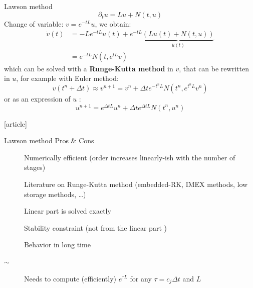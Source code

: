 \documentclass{beamer}
\newcommand{\cmark}{{\color{dgreen}\ding{52}}}
\newcommand{\xmark}{{\color{mred}\ding{55}}}
\newcommand{\bmark}{{\color{morange}$\sim$}}
\newcommand{\mbold}[1]{{\textbf{\color{PLB}#1}}}
\newcommand{\customcite}[1]{\cite{#1}}
\begin{document}
\begin{frame}{Lawson method}
  $$
    \partial_t u = Lu + N(t,u)
  $$
  Change of variable: \mbold{$v = e^{-tL}u$}, we obtain:
  $$
    \begin{aligned}
      \dot{v}(t) &= -Le^{-tL}u(t) + e^{-tL}\underbrace{\left(Lu(t) + N(t,u)\right)}_{\dot{u}(t)} \\
                 &= e^{-tL}N(t,e^{tL}v)
    \end{aligned}
  $$
  which can be solved with a \mbold{Runge-Kutta method} in $v$, that can be rewritten in $u$, for example with Euler method:
  $$
    v(t^n+\Delta t) \approx v^{n+1} = v^n + \Delta t e^{-t^nL}N(t^n,e^{t^nL}v^n)
  $$
  or as an expression of $u$ :
  $$
    u^{n+1} = e^{\Delta t L}u^n + \Delta te^{\Delta t L}N(t^n,u^n)
  $$
  \begin{thebibliography}{9}
    [article]
     \customcite{Lawson:1967a}
     \customcite{Hochbruck:2020}
  \end{thebibliography}
\end{frame}
\begin{frame}{Lawson method}
  {Pros \& Cons}
  \begin{description}
    \item[\cmark] Numerically efficient (order increases linearly-ish with the number of stages)
    \item[\cmark] Literature on Runge-Kutta method (embedded-RK, IMEX methods, low storage methods, \dots)
    \item[\cmark] Linear part is solved exactly
    \item[\xmark] Stability constraint (not from the linear part \cmark)
    \item[\xmark] Behavior in long time
    \item[\bmark] Needs to compute (efficiently) $e^{\tau L}$ for any $\tau=c_j\Delta t$ and $L$
  \end{description}
\end{frame}
\end{document}
